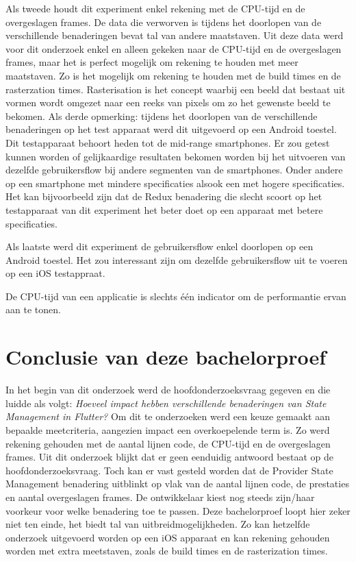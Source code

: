 Als tweede houdt dit experiment enkel rekening met de CPU-tijd en de overgeslagen frames. De data die verworven is tijdens het doorlopen van de verschillende benaderingen bevat tal van andere maatstaven. Uit deze data werd voor dit onderzoek enkel en alleen gekeken naar de CPU-tijd en de overgeslagen frames, maar het is perfect mogelijk om rekening te houden met meer maatstaven. Zo is het mogelijk om rekening te houden met de build times en de rasterzation times. Rasterisation is het concept waarbij een beeld dat bestaat uit vormen wordt omgezet naar een reeks van pixels om zo het gewenste beeld te bekomen. \newline \newline
Als derde opmerking: tijdens het doorlopen van de verschillende benaderingen op het test apparaat werd dit uitgevoerd op een Android toestel. Dit testapparaat behoort heden tot de mid-range smartphones. Er zou getest kunnen worden of gelijkaardige resultaten bekomen worden bij het uitvoeren van dezelfde gebruikersflow bij andere segmenten van de smartphones. Onder andere op een smartphone met mindere specificaties alsook een met hogere specificaties. Het kan bijvoorbeeld zijn dat de Redux benadering die slecht scoort op het testapparaat van dit experiment het beter doet op een apparaat met betere specificaties. 

Als laatste werd dit experiment de gebruikersflow enkel doorlopen op een Android toestel. Het zou interessant zijn om dezelfde gebruikersflow uit te voeren op een iOS testappraat. 

De CPU-tijd van een applicatie is slechts één indicator om de performantie ervan aan te tonen.

\section{Conclusie van deze bachelorproef}
In het begin van dit onderzoek werd de hoofdonderzoeksvraag gegeven en die luidde als volgt: \textit{Hoeveel impact hebben verschillende benaderingen van State Management in Flutter?} Om dit te onderzoeken werd een keuze gemaakt aan bepaalde meetcriteria, aangezien impact een overkoepelende term is. Zo werd rekening gehouden met de aantal lijnen code, de CPU-tijd en de overgeslagen frames. \newline \newline
Uit dit onderzoek blijkt dat er geen eenduidig antwoord bestaat op de hoofdonderzoeksvraag. Toch kan er vast gesteld worden dat de Provider State Management benadering uitblinkt op vlak van de aantal lijnen code, de prestaties en aantal overgeslagen frames. \newline
De ontwikkelaar kiest nog steeds zijn/haar voorkeur voor welke benadering toe te passen. \newline \newline
Deze bachelorproef loopt hier zeker niet ten einde, het biedt tal van uitbreidmogelijkheden. Zo kan hetzelfde onderzoek uitgevoerd worden op een iOS apparaat en kan rekening gehouden worden met extra meetstaven, zoals de build times en de rasterization times.